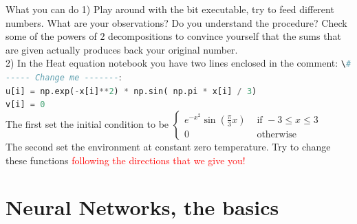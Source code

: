 \documentclass[10pt]{beamer}
\newcommand{\red}[1]{\textcolor{red}{#1}}
\newcommand{\ta}{\left(}
\newcommand{\tc}{\right)}
\renewcommand{\[}{\begin{equation*}}
\renewcommand{\]}{\end{equation*}}
\begin{document}
\begin{frame}{What you can do}
1) Play around with the bit executable, try to feed different numbers. What are your observations? Do you understand the procedure? Check some of the powers of $2$ decompositions to convince yourself that the sums that are given actually produces back your original number.\\
2) In the Heat equation notebook you have two lines enclosed in the comment: \lstinline[language=Python]{\# ----- Change me -------}:\\
\lstinline[language=Python]{u[i] = np.exp(-x[i]**2) * np.sin( np.pi * x[i] / 3)}\\
\lstinline[language=Python]{v[i] = 0}\\
The first set the initial condition to be 
$
\begin{cases}
e^{-x^2}\sin\ta\frac{\pi}{3}x\tc & \text{ if } -3\le x\le 3\\
0 & \text{ otherwise }
\end{cases}
$\\
The second set the environment at constant zero temperature. 
Try to change these functions \red{following the directions that we give you!}



\end{frame}

\section{Neural Networks, the basics}
\end{document}
